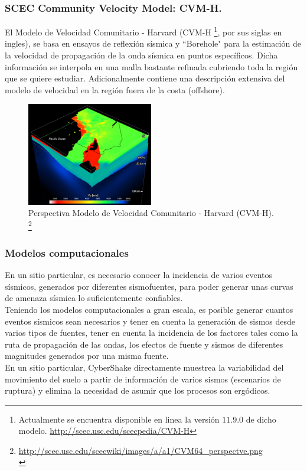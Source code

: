\begin{frame}[allowframebreaks]
\frametitle{SCEC Community Velocity Model: CVM-H.}
%
\justifying
%
El Modelo de Velocidad Comunitario - Harvard (CVM-H \footnote{\tiny Actualmente se encuentra disponible en linea la versión $11.9.0$ de dicho modelo. \url{http://scec.usc.edu/scecpedia/CVM-H}}, por sus siglas en ingles), se basa en ensayos de reflexión sísmica y ``Borehole" para la estimación de la velocidad de propagación de la onda sísmica en puntos específicos. Dicha información se interpola en una malla bastante refinada cubriendo toda la región que se quiere estudiar. Adicionalmente contiene una descripción extensiva del modelo de velocidad en la región fuera de la costa (offshore).
%
\begin{figure}[h]
	\centering
	\includegraphics[height=4.5cm]{img/CVM64_perspectve.pdf}
	\caption{Perspectiva Modelo de Velocidad Comunitario - Harvard (CVM-H). \footnote{\tiny\url{http://scec.usc.edu/scecwiki/images/a/a1/CVM64_perspectve.png}\\}}
	\vspace{-.5 cm}
\end{figure}
%
%
\end{frame}
%
%
\begin{frame}%
\frametitle{Modelos computacionales}
%
\justifying
%
En un sitio particular, es necesario conocer la incidencia de varios eventos sísmicos, generados por diferentes sismofuentes, para poder generar unas curvas de amenaza sísmica lo suficientemente confiables.\\
%
Teniendo los modelos computacionales a gran escala, es posible generar cuantos eventos sísmicos sean necesarios y tener en cuenta la generación de sismos desde varios tipos de fuentes, tener en cuenta la incidencia de los factores tales como la ruta de propagación de las ondas, los efectos de fuente y sismos de diferentes magnitudes generados por una misma fuente.\\
%
En un sitio particular, CyberShake directamente muestrea la variabilidad del movimiento del suelo a partir de información de varios sismos (escenarios de ruptura) y elimina la necesidad de asumir que los procesos son ergódicos.
%
\end{frame}
